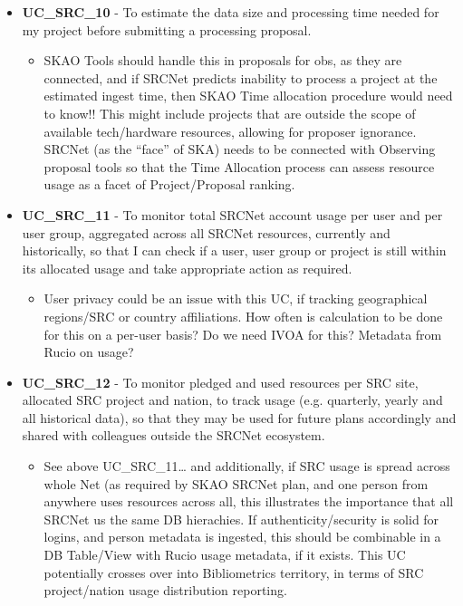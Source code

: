 \begin{itemize}[label={}]
\begin{itemize}[label={}]
    \end{itemize}
    \item {\bf UC\_SRC\_10} - To estimate the data size and processing time needed for my project before submitting a processing proposal.
    \begin{itemize}[label={}]
        \item SKAO Tools should handle this in proposals for obs, as they are connected, and if SRCNet predicts inability to process a project at the estimated ingest time, then SKAO Time allocation procedure would need to know!!   This might include projects that are outside the scope of available tech/hardware resources, allowing for proposer ignorance.  SRCNet (as the “face” of SKA) needs to be connected with Observing proposal tools so that the Time Allocation process can assess resource usage as a facet of Project/Proposal ranking.
    \end{itemize}
    \item {\bf UC\_SRC\_11} - To monitor total SRCNet account usage per user and per user group, aggregated across all SRCNet resources, currently and historically, so that I can check if a user, user group or project is still within its allocated usage and take appropriate action as required.
    \begin{itemize}[label={}]
        \item User privacy could be an issue with this UC, if tracking geographical regions/SRC or country affiliations.  How often is calculation to be done for this on a per-user basis?  Do we need IVOA for this?  Metadata from Rucio on usage?
    \end{itemize}
    \item {\bf UC\_SRC\_12} - To monitor pledged and used resources per SRC site, allocated SRC project and nation, to track usage (e.g. quarterly, yearly and all historical data), so that they may be used for future plans accordingly and shared with colleagues outside the SRCNet ecosystem.
    \begin{itemize}[label={}]
        \item See above UC\_SRC\_11… and additionally, if SRC usage is spread across whole Net (as required by SKAO SRCNet plan, and one person from anywhere uses resources across all, this illustrates the importance that all SRCNet us the same DB hierachies.  If authenticity/security is solid for logins, and person metadata is ingested, this should be combinable in a DB Table/View with Rucio usage metadata, if it exists.    
        This UC potentially crosses over into Bibliometrics territory, in terms of SRC project/nation usage distribution reporting.

\end{itemize}
\end{itemize}
